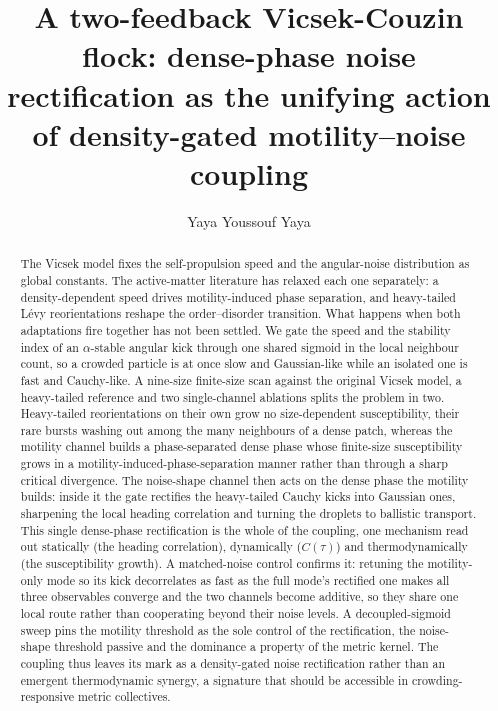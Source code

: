 \documentclass[12pt]{iopart}
\begin{document}
\title{A two-feedback Vicsek-Couzin flock: dense-phase noise rectification as the unifying action of density-gated motility--noise coupling}

\author{Yaya Youssouf Yaya}
\address{D\'epartement de Math\'ematiques, \'Ecole Normale Sup\'erieure de N'Djam\'ena, BP~206, N'Djam\'ena, Tchad}
\address{Chercheur Associ\'e, LMA, U.F.R.~Sciences et Technologies, Universit\'e Assane Seck de Ziguinchor, BP~523, Diabir, Ziguinchor, S\'en\'egal}

\begin{abstract}
The Vicsek model fixes the self-propulsion speed and the
angular-noise distribution as global constants. The
active-matter literature has relaxed each one separately: a
density-dependent speed drives motility-induced phase
separation, and heavy-tailed L\'evy reorientations reshape the
order--disorder transition. What happens when both adaptations
fire together has not been settled. We gate the speed and the
stability index of an $\alpha$-stable angular kick through one
shared sigmoid in the local neighbour count, so a crowded
particle is at once slow and Gaussian-like while an isolated
one is fast and Cauchy-like. A nine-size finite-size scan
against the original Vicsek model, a heavy-tailed reference and
two single-channel ablations splits the problem in two. Heavy-tailed
reorientations on their own grow no size-dependent
susceptibility, their rare bursts washing out among the many
neighbours of a dense patch, whereas the motility channel
builds a phase-separated dense phase whose finite-size
susceptibility grows in a motility-induced-phase-separation
manner rather than through a sharp critical divergence. The
noise-shape channel then acts on the dense phase the motility
builds: inside it the gate rectifies the heavy-tailed Cauchy
kicks into Gaussian ones, sharpening the local heading
correlation and turning the droplets to ballistic transport.
This single dense-phase rectification is the whole of the
coupling, one mechanism read out statically (the heading
correlation), dynamically ($C(\tau)$) and thermodynamically (the
susceptibility growth). A matched-noise control confirms it:
retuning the motility-only mode so its kick decorrelates as fast
as the full mode's rectified one makes all three observables
converge and the two channels become additive, so they share one
local route rather than cooperating beyond their noise levels. A
decoupled-sigmoid sweep pins the motility threshold as the sole
control of the rectification, the noise-shape threshold passive
and the dominance a property of the metric kernel. The coupling
thus leaves its mark as a density-gated noise rectification
rather than an emergent thermodynamic synergy, a signature that
should be accessible in crowding-responsive metric collectives.
\end{abstract}
\end{document}

